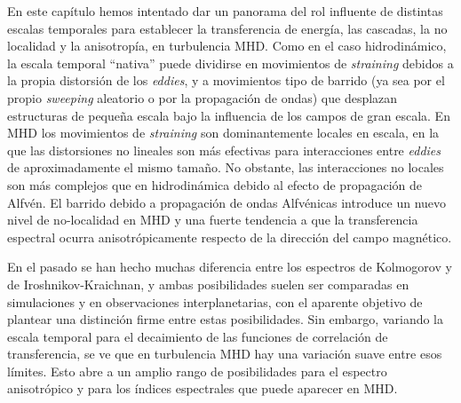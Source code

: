 En este capítulo hemos intentado dar un panorama del rol influente de
distintas escalas temporales para establecer la transferencia de
energía, las cascadas, la no localidad y la anisotropía, en
turbulencia MHD. Como en el caso hidrodinámico, la escala temporal
``nativa'' puede dividirse en movimientos de \textit{straining}
debidos a la propia distorsión de los \textit{eddies}, y a movimientos
tipo de barrido (ya sea por el propio \textit{sweeping} aleatorio o
por la propagación de ondas) que desplazan estructuras de pequeña
escala bajo la influencia de los campos de gran escala. En MHD los
movimientos de \textit{straining} son dominantemente locales en
escala, en la que las distorsiones no lineales son más efectivas para
interacciones entre \textit{eddies} de aproximadamente el mismo
tamaño. No obstante, las interacciones no locales son más
complejos que en hidrodinámica debido al efecto de propagación de
Alfv\'en. El barrido debido a propagación de ondas Alfv\'enicas
introduce un nuevo nivel de no-localidad en MHD y una fuerte tendencia
a que la transferencia espectral ocurra anisotrópicamente respecto de
la dirección del campo magnético.

En el pasado se han hecho muchas diferencia entre los espectros de
Kolmogorov y de Iroshnikov-Kraichnan, y ambas posibilidades suelen ser
comparadas en simulaciones y en observaciones interplanetarias, con el
aparente objetivo de plantear una distinción firme entre estas
posibilidades. Sin embargo, variando la escala temporal para el
decaimiento de las funciones de correlación de transferencia, se ve
que en turbulencia MHD hay una variación suave entre esos límites.
Esto abre a un
amplio rango de posibilidades para el espectro anisotrópico y para los
índices espectrales que puede aparecer en MHD.

